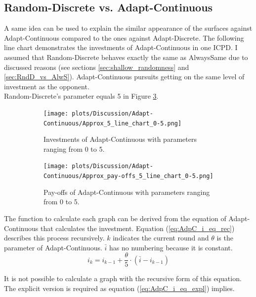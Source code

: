 \documentclass{article}
\begin{document}
\subsection{Random-Discrete vs. Adapt-Continuous}
	A same idea can be used to explain the similar appearance of the surfaces against Adapt-Continuous compared to the ones against Adapt-Discrete.
	The following line chart demonstrates the investments of Adapt-Continuous in one ICPD.
	I assumed that Random-Discrete behaves exactly the same as AlwaysSame due to discussed reasons (see sections \ref{sec:shallow_randomness} and \ref{sec:RndD_vs_AlwS}).
	Adapt-Continuous pursuits getting on the same level of investment as the opponent.\\
	Random-Discrete's parameter equals 5 in Figure \ref{fig:AdpC_approx_invetm_and_payoffs_0-5}.\\
	\begin{figure}[h!]
		\centering
		\begin{subfigure}[t]{0.45\textwidth}
			\centering
			\texttt{[image: plots/Discussion/Adapt-Continuous/Approx\_5\_line\_chart\_0-5.png]}\\
			\caption{Investments of Adapt-Continuous with parameters ranging from 0 to 5.}
			\label{fig:AdpC_approx_investm_0-5}
		\end{subfigure}
		\hfill
		\begin{subfigure}[t]{0.45\textwidth}
			\centering
			\texttt{[image: plots/Discussion/Adapt-Continuous/Approx\_pay-offs\_5\_line\_chart\_0-5.png]}
			\caption{Pay-offs of Adapt-Continuous with parameters ranging from 0 to 5.}
			\label{fig:AdpC_approx_payoff_0-5}
		\end{subfigure}
		\caption{}
		\label{fig:AdpC_approx_invetm_and_payoffs_0-5}
	\end{figure}

	The function to calculate each graph can be derived from the equation of Adapt-Continuous that calculates the investment.
	Equation (\ref{eq:AdpC_i_eq_rec}) describes this process recursively.
	$k$ indicates the current round and $\theta$ is the parameter of Adapt-Continuous.
	$\bar i$ has no numbering because it is constant.
	\begin{equation}
		i_k = i_{k-1} + \frac{\theta}{5} \cdot (\bar i - i_{k-1})
		\label{eq:AdpC_i_eq_rec}
	\end{equation}

	It is not possible to calculate a graph with the recursive form of this equation.
	The explicit version is required as equation (\ref{eq:AdpC_i_eq_expl}) implies.
\end{document}
